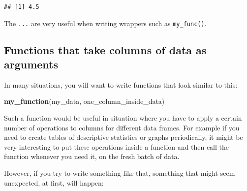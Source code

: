 \documentclass[]{gitbook}
\newenvironment{Shaded}{\begin{snugshade}}{\end{snugshade}}
\newcommand{\ControlFlowTok}[1]{\textcolor[rgb]{0.13,0.29,0.53}{\textbf{#1}}}
\newcommand{\DataTypeTok}[1]{\textcolor[rgb]{0.13,0.29,0.53}{#1}}
\newcommand{\KeywordTok}[1]{\textcolor[rgb]{0.13,0.29,0.53}{\textbf{#1}}}
\newcommand{\NormalTok}[1]{#1}
\newcommand{\OperatorTok}[1]{\textcolor[rgb]{0.81,0.36,0.00}{\textbf{#1}}}
\newcommand{\StringTok}[1]{\textcolor[rgb]{0.31,0.60,0.02}{#1}}
\theoremstyle{definition}
\theoremstyle{definition}
\theoremstyle{definition}
\theoremstyle{remark}
\begin{document}
\begin{verbatim}
## [1] 4.5
\end{verbatim}

The \texttt{...} are very useful when writing wrappers such as
\texttt{my\_func()}.

\hypertarget{functions-that-take-columns-of-data-as-arguments}{%
\subsection{Functions that take columns of data as
arguments}\label{functions-that-take-columns-of-data-as-arguments}}

In many situations, you will want to write functions that look similar
to this:

\begin{Shaded}
\begin{Highlighting}[]
\KeywordTok{my_function}\NormalTok{(my_data, one_column_inside_data)}
\end{Highlighting}
\end{Shaded}

Such a function would be useful in situation where you have to apply a
certain number of operations to columns for different data frames. For
example if you need to create tables of descriptive statistics or graphs
periodically, it might be very interesting to put these operations
inside a function and then call the function whenever you need it, on
the fresh batch of data.

However, if you try to write something like that, something that might
seem unexpected, at first, will happen:

\begin{Shaded}
\end{Shaded}
\end{document}
